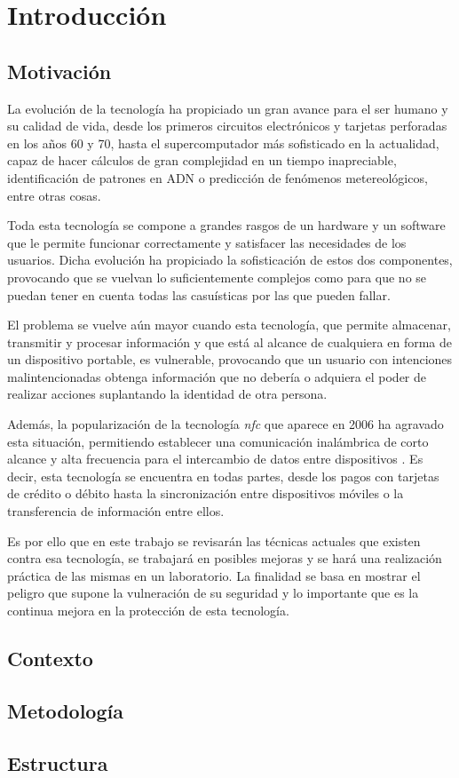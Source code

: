 \chapter{Introducción}

\section {Motivación}

La evolución de la tecnología ha propiciado un gran avance para el ser humano y su calidad de vida, desde los primeros circuitos electrónicos y tarjetas perforadas en los años 60 y 70, hasta el supercomputador más sofisticado en la actualidad, capaz de hacer cálculos de gran complejidad en un tiempo inapreciable, identificación de patrones en ADN o predicción de fenómenos metereológicos, entre otras cosas. \newline

Toda esta tecnología se compone a grandes rasgos de un hardware y un software que le permite funcionar correctamente y satisfacer las necesidades de los usuarios. Dicha evolución ha propiciado la sofisticación de estos dos componentes, provocando que se vuelvan lo suficientemente complejos como para que no se puedan tener en cuenta todas las casuísticas por las que pueden fallar. \newline

El problema se vuelve aún mayor cuando esta tecnología, que permite almacenar, transmitir y procesar información y que está al alcance de cualquiera en forma de un dispositivo portable, es vulnerable, provocando que un usuario con intenciones malintencionadas obtenga información que no debería o adquiera el poder de realizar acciones suplantando la identidad de otra persona. \newline

Además, la popularización de la tecnología \textit{\acrshort{nfc}} que aparece en 2006 ha agravado esta situación, permitiendo establecer una comunicación inalámbrica de corto alcance y alta frecuencia para el intercambio de datos entre dispositivos \cite{NFCFechaCreacion}. Es decir, esta tecnología se encuentra en todas partes, desde los pagos con tarjetas de crédito o débito hasta la sincronización entre dispositivos móviles o la transferencia de información entre ellos. \newline

Es por ello que en este trabajo se revisarán las técnicas actuales que existen contra esa tecnología, se trabajará en posibles mejoras y se hará una realización práctica de las mismas en un laboratorio. La finalidad se basa en mostrar el peligro que supone la vulneración de su seguridad y lo importante que es la continua mejora en la protección de esta tecnología.

\section{Contexto}

\section{Metodología}

\section{Estructura}

